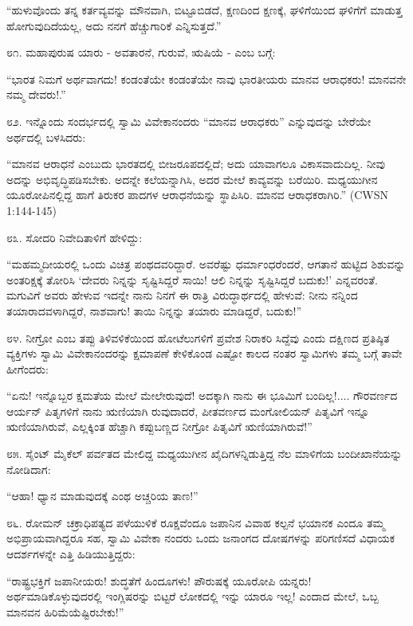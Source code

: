 “ಹುಳುವೊಂದು ತನ್ನ ಕರ್ತವ್ಯವನ್ನು ಮೌನವಾಗಿ, ಬಿಟ್ಟೂಬಿಡದೆ, ಕ್ಷಣದಿಂದ ಕ್ಷಣಕ್ಕೆ, ಘಳಿಗೆಯಿಂದ ಘಳಿಗೆಗೆ ಮಾಡುತ್ತ ಹೋಗುವುದಿದೆಯಲ್ಲ, ಅದು ನನಗೆ ಹೆಚ್ಚುಗಾರಿಕೆ ಎನ್ನಿಸುತ್ತದೆ.” 

೮೧. ಮಹಾಪುರುಷ ಯಾರು - ಅವತಾರನೆ, ಗುರುವೆ, ಋಷಿಯೆ - ಎಂಬ ಬಗ್ಗೆ:

“ಭಾರತ ನಿಮಗೆ ಅರ್ಥವಾಗದು! ಕಂಡಂತೆಯೇ ಕಂಡಂತೆಯೇ ನಾವು ಭಾರತೀಯರು ಮಾನವ ಆರಾಧಕರು! ಮಾನವನೇ ನಮ್ಮ ದೇವರು!.” 

೮೨. ಇನ್ನೊಂದು ಸಂದರ್ಭದಲ್ಲಿ ಸ್ವಾಮಿ ವಿವೇಕಾನಂದರು “ಮಾನವ ಆರಾಧಕರು” ಎನ್ನುವುದನ್ನು ಬೇರೆಯೇ ಅರ್ಥದಲ್ಲಿ ಬಳಸಿದರು:

“ಮಾನವ ಆರಾಧನೆ ಎಂಬುದು ಭಾರತದಲ್ಲಿ ಬೀಜರೂಪದಲ್ಲಿದೆ; ಅದು ಯಾವಾಗಲೂ ವಿಕಾಸವಾದುದಿಲ್ಲ. ನೀವು ಅದನ್ನು ಅಭಿವೃದ್ಧಿಪಡಿಸಬೇಕು. ಅದನ್ನೇ ಕಲೆಯನ್ನಾಗಿಸಿ, ಅದರ ಮೇಲೆ ಕಾವ್ಯವನ್ನು ಬರೆಯಿರಿ. ಮಧ್ಯಯುಗೀನ ಯೂರೋಪಿನಲ್ಲಿದ್ದ ಹಾಗೆ ತಿರುಕರ ಪಾದಗಳ ಆರಾಧನೆಯನ್ನು ಸ್ಥಾಪಿಸಿರಿ. ಮಾನವ ಆರಾಧಕರಾಗಿರಿ.” (CWSN 1:144-145)

೮೩. ಸೋದರಿ ನಿವೇದಿತಾಳಿಗೆ ಹೇಳಿದ್ದು:

“ಮಹಮ್ಮದೀಯರಲ್ಲಿ ಒಂದು ವಿಚಿತ್ರ ಪಂಥದವರಿದ್ದಾರೆ. ಅವರೆಷ್ಟು ಧರ್ಮಾಂಧರೆಂದರೆ, ಆಗತಾನೆ ಹುಟ್ಟಿದ ಶಿಶುವನ್ನು ಅಂತರಿಕ್ಷಕ್ಕೆ ತೋರಿಸಿ ‘ದೇವರು ನಿನ್ನನ್ನು ಸೃಷ್ಟಿಸಿದ್ದರೆ ಸಾಯಿ! ಆಲಿ ನಿನ್ನನ್ನು ಸೃಷ್ಟಿಸಿದ್ದರೆ ಬದುಕು!’ ಎನ್ನವರಂತೆ. ಮಗುವಿಗೆ ಅವರು ಹೇಳುವ ಇದನ್ನೇ ನಾನು ನಿನಗೆ ಈ ರಾತ್ರಿ ವಿರುದ್ಧಾರ್ಥದಲ್ಲಿ ಹೇಳುವೆ: ನೀನು ನನ್ನಿಂದ ತಯಾರಾದವಳಾಗಿದ್ದರೆ, ನಾಶವಾಗು! ತಾಯಿ ನಿನ್ನನ್ನು ತಯಾರು ಮಾಡಿದ್ದರೆ, ಬದುಕು!” 

೮೪. ನೀಗ್ರೋ ಎಂಬ ತಪ್ಪು ತಿಳಿವಳಿಕೆಯಿಂದ ಹೋಟೆಲುಗಳಿಗೆ ಪ್ರವೇಶ ನಿರಾಕರಿ ಸಿದ್ದೆವು ಎಂದು ದಕ್ಷಿಣದ ಪ್ರತಿಷ್ಠಿತ ವ್ಯಕ್ತಿಗಳು ಸ್ವಾಮಿ ವಿವೇಕಾನಂದರನ್ನು ಕ್ಷಮಾಪಣೆ ಕೇಳಿಕೊಂಡ ಎಷ್ಟೋ ಕಾಲದ ನಂತರ ಸ್ವಾಮಿಗಳು ತಮ್ಮ ಬಗ್ಗೆ ತಾವೇ ಹೀಗೆಂದರು:

“ಏನು! ಇನ್ನೊಬ್ಬರ ಕ್ಷಮತೆಯ ಮೇಲೆ ಮೇಲೇರುವುದೆ! ಅದಕ್ಕಾಗಿ ನಾನು ಈ ಭೂಮಿಗೆ ಬಂದಿಲ್ಲ!.... ಗೌರವರ್ಣದ ಆರ್ಯನ್ ಪಿತೃಗಳಿಗೆ ನಾನು ಋಣಿಯಾಗಿ ರುವುದಾದರೆ, ಪೀತವರ್ಣದ ಮಂಗೋಲಿಯನ್ ಪಿತೃವಿಗೆ ಇನ್ನೂ ಋಣಿಯಾಗಿರುವೆ, ಎಲ್ಲಕ್ಕಿಂತ ಹೆಚ್ಚಾಗಿ ಕಪ್ಪುಬಣ್ಣದ ನೀಗ್ರೋ ಪಿತೃವಿಗೆ ಋಣಿಯಾಗಿರುವೆ!” 

೮೫. ಸೈಂಟ್ ಮೈಕೆಲ್ ಪರ್ವತದ ಮೇಲಿದ್ದ ಮಧ್ಯಯುಗೀನ ಖೈದಿಗಳನ್ನಿಡುತ್ತಿದ್ದ ನೆಲ ಮಾಳಿಗೆಯ ಬಂದೀಖಾನೆಯನ್ನು ನೋಡಿದಾಗ:

“ಆಹಾ! ಧ್ಯಾನ ಮಾಡುವುದಕ್ಕೆ ಎಂಥ ಅಚ್ಚರಿಯ ತಾಣ!” 

೮೬. ರೋಮನ್ ಚಕ್ರಾಧಿಪತ್ಯದ ಪಳೆಯುಳಿಕೆ ರೂಕ್ಷವೆಂದೂ ಜಪಾನಿನ ವಿವಾಹ ಕಲ್ಪನೆ ಭಯಾನಕ ಎಂದೂ ತಮ್ಮ ಅಭಿಪ್ರಾಯವಾಗಿದ್ದರೂ ಸಹ, ಸ್ವಾಮಿ ವಿವೇಕಾ ನಂದರು ಒಂದು ಜನಾಂಗದ ದೋಷಗಳನ್ನು ಪರಿಗಣಿಸದೆ ವಿಧಾಯಕ ಆದರ್ಶಗಳನ್ನೇ ಎತ್ತಿ ಹಿಡಿಯುತ್ತಿದ್ದರು:

“ರಾಷ್ಟ್ರಭಕ್ತಿಗೆ ಜಪಾನೀಯರು! ಶುದ್ಧತೆಗೆ ಹಿಂದೂಗಳು! ಪೌರುಷಕ್ಕೆ ಯೂರೋಪಿ ಯನ್ನರು! ಅರ್ಥಮಾಡಿಕೊಳ್ಳುವುದರಲ್ಲಿ ಇಂಗ್ಲಿಷರನ್ನು ಬಿಟ್ಟರೆ ಲೋಕದಲ್ಲಿ ಇನ್ನು ಯಾರೂ ಇಲ್ಲ! ಎಂದಾದ ಮೇಲೆ, ಒಬ್ಬ ಮಾನವನ ಹಿರಿಮೆಯೆಷ್ಟಿರಬೇಕು!” 

